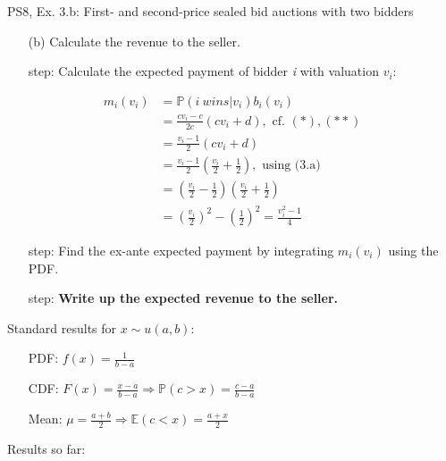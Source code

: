 \begin{frame}{PS8, Ex. 3.b: First- and second-price sealed bid auctions with two bidders}
    \begin{multicols}{2}
      \begin{itemize}
        \item[(b)] Calculate the revenue to the seller.
        \item[\nth{1} step:] Calculate the expected payment of bidder \textit{i} with valuation $v_i$:
      \end{itemize}
      \vspace{-12pt}
      \begin{align*}
        m_i(v_i)&=\mathbb{P}(i\ wins|v_i)b_i(v_i)\\
                &=\frac{cv_i-c}{2c}(cv_i+d),\text{ cf. }(*),(**)\\
                &=\frac{v_i-1}{2}(cv_i+d)\\
                &=\frac{v_i-1}{2}\left(\frac{v_i}{2}+\frac{1}{2}\right),\text{ using (3.a)}\\
                &=\left(\frac{v_i}{2}-\frac{1}{2}\right)\left(\frac{v_i}{2}+\frac{1}{2}\right)\\
                &=\left(\frac{v_i}{2}\right)^2-\left(\frac{1}{2}\right)^2
                 =\frac{v_i^2-1}{4}
      \end{align*}
      \vspace{-18pt}
      \begin{itemize}
        \item[\nth{2} step:] Find the ex-ante expected payment by integrating $m_i(v_i)$ using the PDF.
        \item[\nth{3} step:] \textbf{Write up the expected revenue to the seller.}
      \end{itemize}
      \vfill\null\columnbreak
      Standard results for $x\sim u(a, b):$
      \vspace{-6pt}
      \begin{enumerate}
        \item[PDF:] $f(x)=\frac{1}{b-a}$
        \item[CDF:] $F(x)=\frac{x-a}{b-a}\Rightarrow\mathbb{P}(c>x)=\frac{c-a}{b-a}$
        \item[Mean:] $\mu=\frac{a+b}{2}\Rightarrow\mathbb{E}(c<x)=\frac{a+x}{2}$
      \end{enumerate}
      \vspace{-6pt}
      Results so far:
      \vspace{-6pt}
      \begin{itemize}

\end{itemize}
\end{multicols}
\end{frame}
